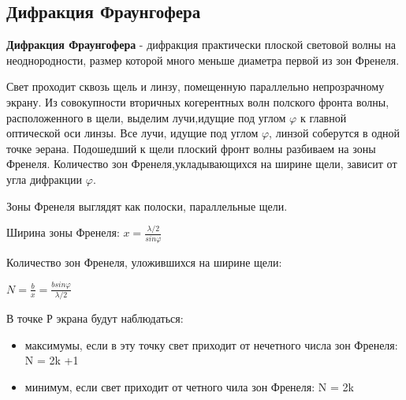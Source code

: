 \documentclass[12pt]{report}
\begin{document}
\subsection{Дифракция Фраунгофера}
\textbf{Дифракция Фраунгофера} - дифракция практически плоской световой волны на неоднородности, размер которой много меньше диаметра первой из зон Френеля.\par
Свет проходит сквозь щель и линзу, помещенную параллельно непрозрачному экрану. Из совокупности вторичных когерентных волн полского фронта волны, расположенного в щели, выделим лучи,идущие под углом $\varphi$ к главной оптической оси линзы. Все лучи, идущие под углом $\varphi$, линзой соберутся в одной точке эерана. Подошедший к щели плоский фронт волны разбиваем на зоны Френеля. Количество зон Френеля,укладывающихся на ширине щели, зависит от угла дифракции $\varphi$.\par
Зоны Френеля выглядят как полоски, параллельные щели.\par
Ширина зоны Френеля: $x = \frac{\lambda /2}{sin \varphi}$\par
Количество зон Френеля, уложившихся на ширине щели:\par
$N = \frac{b}{x} = \frac{b sin\varphi}{\lambda /2}$\par
В точке Р экрана будут наблюдаться:\par
\begin{itemize}
    \item максимумы, если в эту точку свет приходит от нечетного числа зон Френеля: N = 2k +1\par
    \item минимум, если свет приходит от четного чила зон Френеля: N = 2k\par
\end{itemize}
\end{document}

